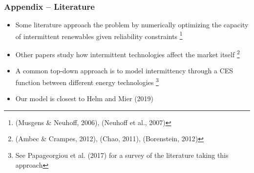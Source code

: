 \documentclass[aspectratio=169]{beamer}
\begin{document}
	\begin{frame}
		\frametitle{Appendix -- Literature}
		
		\begin{itemize}
			\setlength\itemsep{0.2em}
			\item Some literature approach the problem by numerically optimizing the capacity of intermittent renewables given reliability constraints \footnote{(Musgens \& Neuhoff, 2006), (Neuhoff et al., 2007)}
			\item Other papers study how intermittent technologies affect the market itself \footnote{(Ambec \& Crampes, 2012), (Chao, 2011), (Borenstein, 2012)}	
			\item A common top-down approach is to model intermittency through a CES function between different energy technologies \footnote{See Papageorgiou et al. (2017) for a survey of the literature taking this approach}
			\item Our model is closest to Helm and Mier (2019)
		\end{itemize}
		
	\end{frame}
	
\end{document}
